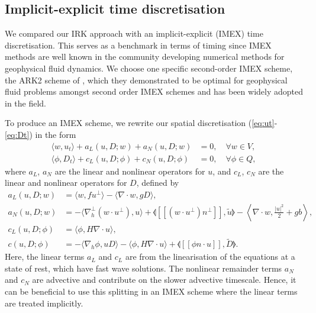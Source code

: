 \documentclass[a4paper, 12pt]{article}
\newcommand{\jump}[1]{[\![#1]\!]}
\begin{document}
\subsection{Implicit-explicit time discretisation}

We compared our IRK approach with an
implicit-explicit (IMEX) time discretisation. This serves as a
benchmark in terms of timing since IMEX methods are well known in the
community developing numerical methods for geophysical fluid dynamics.
We choose one specific second-order IMEX scheme, the ARK2 scheme
of \citet{giraldo2013implicit}, which they demonstrated to be optimal
for geophysical fluid problems amongst second order IMEX schemes and has
been widely adopted in the field.

To produce an IMEX scheme, we rewrite our spatial discretisation
(\ref{eq:ut}-\ref{eq:Dt}) in the form
\begin{align}
  \label{eq:ut IMEX}
  \langle w, u_t \rangle + a_L(u,D;w) 
  + a_N(u,D;w) 
   & = 0,
  \quad \forall w \in V, \\
  \label{eq:Dt IMEX}
  \langle \phi, D_t \rangle
+ c_L(u,D; \phi) + c_N(u,D; \phi)  & =
 0, \quad \forall \phi \in Q,
\end{align}
where $a_L$, $a_N$ are the linear and nonlinear operators for $u$,
and $c_L$, $c_N$ are the linear and nonlinear operators for $D$,
defined by
\begin{align}
  a_L(u,D;w) & = \langle w, fu^\perp \rangle - \langle \nabla\cdot w,
  gD \rangle, \\
   a_N(u,D;w) 
&=
  - \langle \nabla_h^\perp (w\cdot u^\perp), u \rangle
  + \llangle \jump{(w\cdot u^\perp) n^\perp}, \tilde{u} \rrangle  - \left\langle \nabla\cdot w, \frac{|u|^2}{2} + gb \right\rangle, \\
  c_L(u,D;\phi) & = \langle \phi, H\nabla\cdot u\rangle, \\
  c(u,D; \phi) &=
  - \langle \nabla_h \phi, uD \rangle
  - \langle \phi, H\nabla\cdot u\rangle
  + \llangle \jump{\phi n\cdot u}, \tilde{D} \rrangle.
\end{align}
Here, the linear terms $a_L$ and $c_L$ are from the linearisation of
the equations at a state of rest, which have fast wave solutions.
The nonlinear remainder terms $a_N$ and $c_N$ are advective and contribute
on the slower advective timescale. Hence, it can be beneficial to use this
splitting in an IMEX scheme where the linear terms are treated implicitly.
\end{document}

